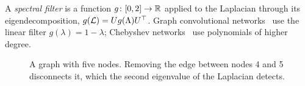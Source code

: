 A \emph{spectral filter} is a function $g \colon [0, 2] \to \mathbb{R}$ applied to the Laplacian through its eigendecomposition, $g(\mathcal{L}) = U g(\Lambda) U^\top$. Graph convolutional networks~\cite{kipf2017semi} use the linear filter $g(\lambda) = 1 - \lambda$; Chebyshev networks~\cite{defferrard2016convolutional} use polynomials of higher degree.

\begin{figure}[ht]
  \centering
  \caption{A graph with five nodes. Removing the edge between nodes 4 and 5 disconnects it, which the second eigenvalue of the Laplacian detects.}
  \label{fig:example-graph}
\end{figure}
